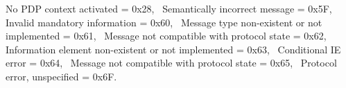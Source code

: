 \begin{DoxyItemize}
 No P\+DP context activated = 0x28,~\newline
 Semantically incorrect message = 0x5F,~\newline
 Invalid mandatory information = 0x60,~\newline
 Message type non-\/existent or not implemented = 0x61,~\newline
 Message not compatible with protocol state = 0x62,~\newline
 Information element non-\/existent or not implemented = 0x63,~\newline
 Conditional IE error = 0x64,~\newline
 Message not compatible with protocol state = 0x65,~\newline
 Protocol error, unspecified = 0x6F.~\newline

\end{DoxyItemize}

